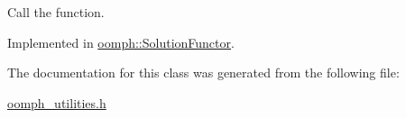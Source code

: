 Call the function. 



Implemented in \hyperlink{classoomph_1_1SolutionFunctor_ae0428bc44f99335bd2b3d6f7203984d5}{oomph\+::\+Solution\+Functor}.



The documentation for this class was generated from the following file\+:\begin{DoxyCompactItemize}
\item 
\hyperlink{oomph__utilities_8h}{oomph\+\_\+utilities.\+h}\end{DoxyCompactItemize}
